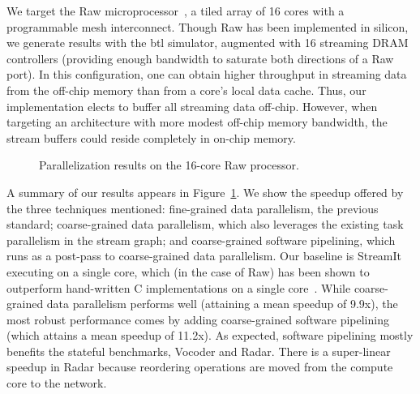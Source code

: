We target the Raw microprocessor~\cite{raw10,raw}, a tiled array of 16
cores with a programmable mesh interconnect.  Though Raw has been
implemented in silicon, we generate results with the btl simulator,
augmented with 16 streaming DRAM controllers (providing enough
bandwidth to saturate both directions of a Raw port).  In this
configuration, one can obtain higher throughput in streaming data from
the off-chip memory than from a core's local data cache.  Thus, our
implementation elects to buffer all streaming data off-chip.  However,
when targeting an architecture with more modest off-chip memory
bandwidth, the stream buffers could reside completely in on-chip
memory.

\begin{figure}[t]
\centering
{}
\caption[Parallelization results]{Parallelization results on the
  16-core Raw processor.\protect\label{fig:par-results}}
\end{figure}

A summary of our results appears in Figure~\ref{fig:par-results}.  We
show the speedup offered by the three techniques mentioned:
fine-grained data parallelism, the previous standard; coarse-grained
data parallelism, which also leverages the existing task parallelism
in the stream graph; and coarse-grained software pipelining, which
runs as a post-pass to coarse-grained data parallelism.  Our baseline
is StreamIt executing on a single core, which (in the case of Raw) has
been shown to outperform hand-written C implementations on a single
core~\cite{raw_isca}.  While coarse-grained data parallelism performs
well (attaining a mean speedup of 9.9x), the most robust performance
comes by adding coarse-grained software pipelining (which attains a
mean speedup of 11.2x).  As expected, software pipelining mostly
benefits the stateful benchmarks, Vocoder and Radar.  There is a
super-linear speedup in Radar because reordering operations are moved
from the compute core to the network.



